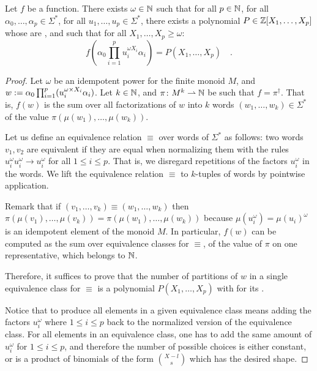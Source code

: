 \begin{lemma}
    \label{n-poly-combinatorics:lem}
    Let $f$ be a   function. 
    There exists $\omega \in \mathbb{N}$
    such that for all $p \in \mathbb{N}$,
    for all $\alpha_0, \dots, \alpha_p \in \Sigma^*$,
    for all $u_1, \dots, u_p \in \Sigma^*$,
    there exists a polynomial $P \in \mathbb{Z}[X_1, \dots, X_p]$
    whose  are ,
    and such that for all $X_1, \dots, X_p \geq \omega$:
    \begin{equation*}
        f\left(
            \alpha_0 \prod_{i = 1}^p u_i^{\omega X_i} \alpha_i
        \right)
        = P(X_1, \dots, X_p) \quad .
    \end{equation*}
\end{lemma}
\begin{proof}
    Let $\omega$ be an idempotent power for the finite monoid $M$,
    and
    $w \mathrel{:=} \alpha_0 \prod_{i = 1}^p (u_i^{\omega \times X_i} \alpha_i)$.
    Let $k \in \mathbb{N}$, and $\pi \colon M^k \rightharpoonup \mathbb{N}$ be such that
    $f = \pi^\dagger$. That is, 
    $f(w)$ is the sum over all factorizations of $w$
    into $k$ words $(w_1, \dots, w_k) \in \Sigma^*$
    of the value $\pi(\mu(w_1), \dots, \mu(w_k))$.

    Let us define an equivalence relation $\equiv$ over words of
    $\Sigma^*$ as follows: two words $v_1, v_2$ are equivalent if they are
    equal when normalizing them with the rules $u_i^{\omega} u_i^{\omega} \to
    u_i^{\omega}$ for all $1 \leq i \leq p$. That is, we disregard
    repetitions of the factors $u_i^{\omega}$ in the words.
    We lift the equivalence relation $\equiv$ to $k$-tuples of
    words by pointwise application.

    Remark that if $(v_1, \dots, v_k) \equiv (w_1, \dots, w_k)$ then
    $\pi(\mu(v_1), \dots, \mu(v_k)) = \pi(\mu(w_1), \dots, \mu(w_k))$ because
    $\mu(u_i^\omega) = \mu(u_i)^\omega$ is an idempotent element of the monoid
    $M$. In particular, $f(w)$ can be computed as the sum over equivalence
    classes for $\equiv$, of the value of $\pi$ on one representative,
    which belongs to $\mathbb{N}$.

    Therefore, it suffices to prove that the number of partitions of $w$ in a
    single equivalence class for $\equiv$ is a polynomial $P(X_1, \dots, X_p)$
    with  for its .

    Notice that to produce all elements in a given equivalence class
    means adding the factors $u_i^\omega$ where $1 \leq i \leq p$
    back to the normalized version
    of the equivalence class. For all elements in an equivalence class,
    one has to add the same amount of $u_i^\omega$ for $1 \leq i \leq p$,
    and therefore the number of possible choices
    is either constant, or 
    is a product of binomials of the form $\binom{X - l}{s}$
    which has the desired shape.
\end{proof}


